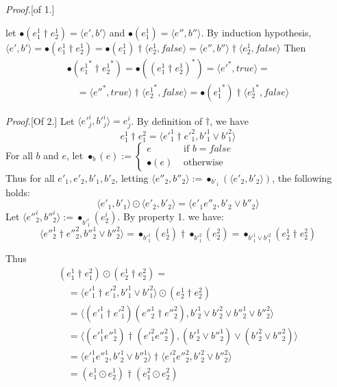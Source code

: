 \documentclass[preprint]{sigplanconf}
\newcommand{\true}{\mathit{true}}
\newcommand{\false}{\mathit{false}}
\newcounter{item}
\newenvironment{proof}{\begin{trivlist}\item[]{\em Proof.}}{\end{trivlist}}
\begin{document}
\begin{proof}[of 1.]
\begin{itemize}
let $\bullet(e^1_1 \dagger e^1_2) = \langle e',b' \rangle$ and
$\bullet(e^1_1) = \langle e'',b'' \rangle$. By induction hypothesis,
$\langle e',b' \rangle = \bullet(e^1_1 \dagger e^1_2) =
 \bullet(e^1_1) \dagger \langle e^1_2, \false \rangle = \langle e'',b'' \rangle \dagger \langle e^1_2, \false \rangle$
Then\\
$$
\begin{array}{l}
\bullet({e^1_1}^* \dagger {e^1_2}^*) =
\bullet ((e^1_1 \dagger e^1_2)^*)
= \langle e'^*,\true \rangle = \\
\quad = \langle e''^*, \true \rangle \dagger \langle {e^1_2}^*, \false \rangle
= \bullet({e^1_1}^*) \dagger \langle {e^1_2}^*, \false \rangle
\end{array}
$$
\end{itemize}
\end{proof}
\begin{proof}[Of 2.]
Let $\langle e'^i_j,b'^i_j \rangle = e^i_j$.
By definition of $\dagger$, we have
$$e^1_1 \dagger e^2_1 = \langle e'^1_1 \dagger e'^2_1, b'^1_1 \vee b'^2_1 \rangle$$
For all $b$ and $e$, let $\bullet_b(e) := \begin{cases} e & \mbox{ if $b = \false$ }\\
                                                \bullet(e) & \mbox{ otherwise } \end{cases}$\\
Thus for all $e'_1,e'_2,b'_1,b'_2$, letting
$\langle e''_2,b''_2 \rangle := \bullet_{b'_1} (\langle e'_2,b'_2\rangle)$, the following holds:
$$\langle e'_1, b'_1 \rangle \odot \langle e'_2, b'_2 \rangle = \langle e'_1 e''_2, b'_2 \vee b''_2 \rangle$$
Let $\langle e''^i_2,b''^i_2 \rangle := \bullet_{b'^i_1}(e^i_2)$. By property 1. we have: $$
\langle e''^1_2 \dagger e''^2_2, b''^1_2 \vee b''^2_2 \rangle =
\bullet_{b'^1_1}(e^1_2) \dagger \bullet_{b'^2_1}(e^2_2) =
\bullet_{b'^1_1 \vee b'^2_1}(e^1_2 \dagger e^2_2)$$

Thus
\[\begin{array}{l}
(e^1_1 \dagger e^2_1) \odot (e^1_2 \dagger e^2_2) = \\
\quad = \langle e'^1_1 \dagger e'^2_1, b'^1_1 \vee b'^2_1 \rangle \odot
        (e^1_2 \dagger e^2_2) \\
\quad = \langle (e'^1_1 \dagger e'^2_1)(e''^1_2 \dagger e''^2_2),
       b'^1_2 \vee b'^2_2 \vee b''^1_2 \vee b''^2_2 \rangle \\
\quad = \langle (e'^1_1 e''^1_2) \dagger (e'^2_1 e''^2_2),
       (b'^1_2 \vee b''^1_2) \vee (b'^2_2 \vee b''^2_2) \rangle \\
\quad = \langle e'^1_1 e''^1_2, b'^1_2 \vee b''^1_2 \rangle \dagger
        \langle e'^2_1 e''^2_2, b'^2_2 \vee b''^2_2 \rangle \\
\quad = (e^1_1 \odot e^1_2) \dagger (e^2_1 \odot e^2_2) \\
\end{array}\]
\end{proof}
\end{document}
